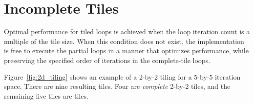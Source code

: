 \pagebreak
\section{Incomplete Tiles}
\label{sec:incomplete_tiles}

Optimal performance for tiled loops is achieved when the loop iteration count is a multiple of the tile size.
When this condition does not exist, the implementation is free to execute the partial loops in a manner that
optimizes performance, while preserving the specified order of iterations in the complete-tile loops.

Figure~\ref{fig:2d_tiling} shows an example of a 2-by-2 tiling for a 5-by-5 iteration space.
There are nine resulting tiles. Four are \emph{complete} 2-by-2 tiles, and the
remaining five tiles are  tiles.

